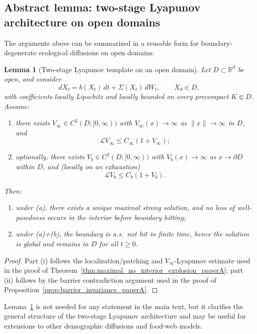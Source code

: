 \documentclass[pdflatex,sn-mathphys-ay]{sn-jnl}
\theoremstyle{thmstyleone}
\newtheorem{lemma}[theorem]{Lemma}
\theoremstyle{definition}
\theoremstyle{remark}
\begin{document}
\begin{appendices}
\subsection{Abstract lemma: two-stage Lyapunov architecture on open domains}
\label{appC:abstract_template}

The arguments above can be summarized in a reusable form for boundary-degenerate ecological diffusions on open domains.

\begin{lemma}[Two-stage Lyapunov template on an open domain]
\label{lem:appC_two_stage_template}
Let \(D\subset\mathbb R^d\) be open, and consider
\[
dX_t=b(X_t)\,dt+\Sigma(X_t)\,dW_t,\qquad X_0\in D,
\]
with coefficients locally Lipschitz and locally bounded on every precompact \(K\Subset D\). Assume:
\begin{enumerate}[label=(\alph*)]
\item there exists \(V_\infty\in C^2(D;[0,\infty))\) with \(V_\infty(x)\to\infty\) as \(\|x\|\to\infty\) in \(D\), and
\[
\mathcal LV_\infty\le C_\infty(1+V_\infty);
\]
\item optionally, there exists \(V_b\in C^2(D;[0,\infty))\) with \(V_b(x)\to\infty\) as \(x\to\partial D\) within \(D\), and (locally on an exhaustion) 
\[
\mathcal LV_b\le C_b(1+V_b).
\]
\end{enumerate}
Then:
\begin{enumerate}[label=(\roman*),leftmargin=1.8em]
\item under (a), there exists a unique maximal strong solution, and no loss of well-posedness occurs in the interior before boundary hitting;
\item under (a)+(b), the boundary is a.s.\ not hit in finite time, hence the solution is global and remains in \(D\) for all \(t\ge0\).
\end{enumerate}
\end{lemma}

\begin{proof}
Part (i) follows the localization/patching and \(V_\infty\)-Lyapunov estimate used in the proof of Theorem~\ref{thm:maximal_no_interior_explosion_paperA}; part (ii) follows by the barrier contradiction argument used in the proof of Proposition~\ref{prop:barrier_invariance_paperA}.
\end{proof}

Lemma~\ref{lem:appC_two_stage_template} is not needed for any statement in the main text, but it clarifies the general structure of the two-stage Lyapunov architecture and may be useful for extensions to other demographic diffusions and food-web models.

\end{appendices}


\end{document}
